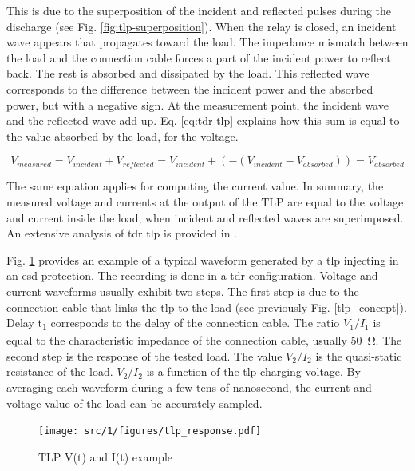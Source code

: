 This is due to the superposition of the incident and reflected pulses during the discharge (see Fig. \ref{fig:tlp-superposition}).
When the relay is closed, an incident wave appears that propagates toward the load.
The impedance mismatch between the load and the connection cable forces a part of the incident power to reflect back.
The rest is absorbed and dissipated by the load.
This reflected wave corresponds to the difference between the incident power and the absorbed power, but with a negative sign.
At the measurement point, the incident wave and the reflected wave add up.
Eq. \ref{eq:tdr-tlp} explains how this sum is equal to the value absorbed by the load, for the voltage.

\begin{equation}
V_{measured} = V_{incident} + V_{reflected} = V_{incident} + (- (V_{incident} - V_{absorbed})) = V_{absorbed}
\label{eq:tdr-tlp}
\end{equation}

The same equation applies for computing the current value.
In summary, the measured voltage and currents at the output of the TLP are equal to the voltage and current inside the load, when incident and reflected waves are superimposed.
An extensive analysis of \gls{tdr} \gls{tlp} is provided in \cite{phd-monnereau}.

Fig. \ref{fig:typical-tlp-response} provides an example of a typical waveform generated by a \gls{tlp} injecting in an \gls{esd} protection.
The recording is done in a \gls{tdr} configuration.
Voltage and current waveforms usually exhibit two steps.
The first step is due to the connection cable that links the \gls{tlp} to the load (see previously Fig. \ref{tlp_concept}).
Delay \textDelta{}t\textsubscript{1} corresponds to the delay of the connection cable.
The ratio $V_{1}/I_{1}$ is equal to the characteristic impedance of the connection cable, usually \SI{50}{\ohm}.
The second step is the response of the tested load.
The value $V_{2}/I_{2}$ is the quasi-static resistance of the load.
$V_{2}/I_{2}$ is a function of the \gls{tlp} charging voltage.
By averaging each waveform during a few tens of nanosecond, the current and voltage value of the load can be accurately sampled.

\begin{figure}[!h]
  \centering
  \texttt{[image: src/1/figures/tlp\_response.pdf]}
  \caption{TLP V(t) and I(t) example}
  \label{fig:typical-tlp-response}
\end{figure}

